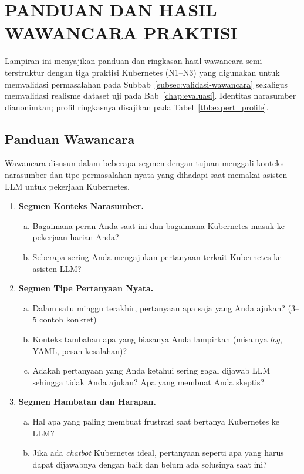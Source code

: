 ﻿\cleardoublepage
\chapter{PANDUAN DAN HASIL WAWANCARA PRAKTISI}
\label{lampiran:wawancara}

Lampiran ini menyajikan panduan dan ringkasan hasil wawancara semi-terstruktur dengan tiga praktisi Kubernetes (N1--N3) yang digunakan untuk memvalidasi permasalahan pada Subbab~\ref{subsec:validasi-wawancara} sekaligus memvalidasi realisme dataset uji pada Bab~\ref{chap:evaluasi}. Identitas narasumber dianonimkan; profil ringkasnya disajikan pada Tabel~\ref{tbl:expert_profile}.

\section{Panduan Wawancara}

Wawancara disusun dalam beberapa segmen dengan tujuan menggali konteks narasumber dan tipe permasalahan nyata yang dihadapi saat memakai asisten LLM untuk pekerjaan Kubernetes.

\begin{enumerate}
    \item \textbf{Segmen Konteks Narasumber.}
    \begin{enumerate}[a.]
        \item Bagaimana peran Anda saat ini dan bagaimana Kubernetes masuk ke pekerjaan harian Anda?
        \item Seberapa sering Anda mengajukan pertanyaan terkait Kubernetes ke asisten LLM?
    \end{enumerate}
    \item \textbf{Segmen Tipe Pertanyaan Nyata.}
    \begin{enumerate}[a.]
        \item Dalam satu minggu terakhir, pertanyaan apa saja yang Anda ajukan? (3--5 contoh konkret)
        \item Konteks tambahan apa yang biasanya Anda lampirkan (misalnya \textit{log}, YAML, pesan kesalahan)?
        \item Adakah pertanyaan yang Anda ketahui sering gagal dijawab LLM sehingga tidak Anda ajukan? Apa yang membuat Anda skeptis?
    \end{enumerate}
    \item \textbf{Segmen Hambatan dan Harapan.}
    \begin{enumerate}[a.]
        \item Hal apa yang paling membuat frustrasi saat bertanya Kubernetes ke LLM?
        \item Jika ada \textit{chatbot} Kubernetes ideal, pertanyaan seperti apa yang harus dapat dijawabnya dengan baik dan belum ada solusinya saat ini?
    \end{enumerate}
\end{enumerate}

